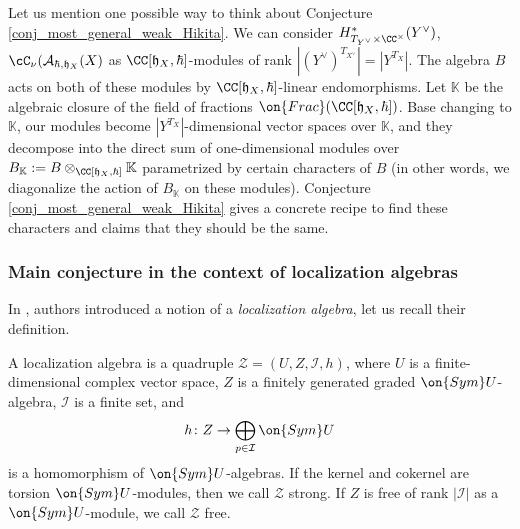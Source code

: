 \documentclass[12pt]{amsart}
\begin{document}
\begin{rmk}\label{form_conj_as_solving}
Let us mention one possible way to think about Conjecture \ref{conj_most_general_weak_Hikita}. We can consider $H^*_{T_{Y^\vee} \times \CC^\times}(Y^\vee)$, $\cC_\nu(\mathcal{A}_{\hbar,\mathfrak{h}_X}(X)$ as $\CC[\mathfrak{h}_X,\hbar]$-modules of rank $|(Y^\vee)^{T_{X^\vee}}|=|Y^{T_X}|$.
The algebra $B$ acts on both of these modules by $\CC[\mathfrak{h}_X,\hbar]$-linear endomorphisms. Let $\mathbb{K}$ be the algebraic closure of the field of fractions $\on{Frac}(\CC[\mathfrak{h}_X,\hbar])$. Base changing to $\mathbb{K}$, our modules become $|Y^{T_X}|$-dimensional vector spaces over $\mathbb{K}$, and they decompose into the direct sum of one-dimensional modules over $B_{\mathbb{K}}:=B \otimes_{\CC[\mathfrak{h}_X,\hbar]} \mathbb{K}$ parametrized by certain characters of $B$ (in other words, we diagonalize the action of $B_{\mathbb{K}}$ on these modules). Conjecture \ref{conj_most_general_weak_Hikita} gives a concrete recipe to find these characters and claims that they should be the same.  
\end{rmk}

\subsubsection{Main conjecture in the context of localization algebras}

In \cite[Definition 2.1]{localiz_alg}, authors introduced a notion of a {\emph{localization algebra}}, let us recall their definition. 

\begin{definition} A 
localization algebra is a quadruple $\mathcal{Z}=(U,Z,\mathcal{I},h)$, where $U$ is a finite-dimensional complex vector space, $Z$ is a finitely generated graded $\on{Sym}U$-algebra, $\mathcal{I}$ is a finite set, and 
\begin{equation*}
h\colon Z \rightarrow \bigoplus_{p \in \mathcal{I}}\on{Sym}U
\end{equation*}
is a homomorphism of $\on{Sym}U$-algebras. If the kernel and cokernel are torsion $\on{Sym}U$-modules, then we call $\mathcal{Z}$ strong. If $Z$ is free of rank $|\mathcal{I}|$ as a $\on{Sym}U$-module, we call $\mathcal{Z}$ free.  
\end{definition}
\end{document}
